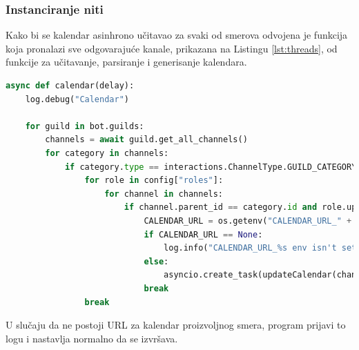 \documentclass[a4paper,11pt]{article}
\begin{document}
\subsubsection{Instanciranje niti}
Kako bi se kalendar asinhrono učitavao za svaki od smerova odvojena je funkcija koja pronalazi sve odgovarajuće kanale, prikazana na Listingu \ref{lst:threads}, od funkcije za učitavanje, parsiranje i generisanje kalendara.
\begin{lstlisting}[language=Python, caption=Instanciranje niti, label=lst:threads]
async def calendar(delay):
    log.debug("Calendar")

    for guild in bot.guilds:
        channels = await guild.get_all_channels()
        for category in channels:
            if category.type == interactions.ChannelType.GUILD_CATEGORY and category.name.upper() == "calendar":
                for role in config["roles"]:
                    for channel in channels:
                        if channel.parent_id == category.id and role.upper() == channel.name.upper():
                            CALENDAR_URL = os.getenv("CALENDAR_URL_" + role)
                            if CALENDAR_URL == None:
                                log.info("CALENDAR_URL_%s env isn't set, skipping."%(role))
                            else:
                                asyncio.create_task(updateCalendar(channel, CALENDAR_URL, delay))
                            break
                break
\end{lstlisting}
U slučaju da ne postoji URL za kalendar proizvoljnog smera, program prijavi to logu i nastavlja normalno da se izvršava.
\newpage
\end{document}
